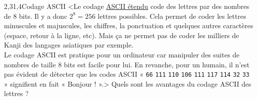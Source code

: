 \begin{quiz}[title={Représentation de l'information}]
\begin{quizquestion}[b]{2,3}{1,4}{Codage ASCII}
<Le codage \href{https://fr.wikipedia.org/wiki/ASCII\_\%C3\%A9tendu}{ASCII étendu} code des lettres par des nombres de 8 bits. Il y a donc $2^8 = 256$ lettres possibles. Cela permet de coder les lettres minuscules et majuscules, les chiffres, la ponctuation et quelques autres caractères (espace, retour à la ligne, etc). Mais ça ne permet pas de coder les milliers de Kanji des langages asiatiques par exemple.\\
Le codage ASCII est pratique pour un ordinateur car manipuler des suites de nombres de taille 8 bits est facile pour lui. En revanche, pour un humain, il n'est pas évident de détecter que les codes ASCII « \texttt{66} \texttt{111} \texttt{110} \texttt{106} \texttt{111} \texttt{117} \texttt{114} \texttt{32} \texttt{33} » signifient en fait « Bonjour ! ».>
Quels sont les avantages du codage ASCII des lettres ?
\end{quizquestion}
\end{quiz}


